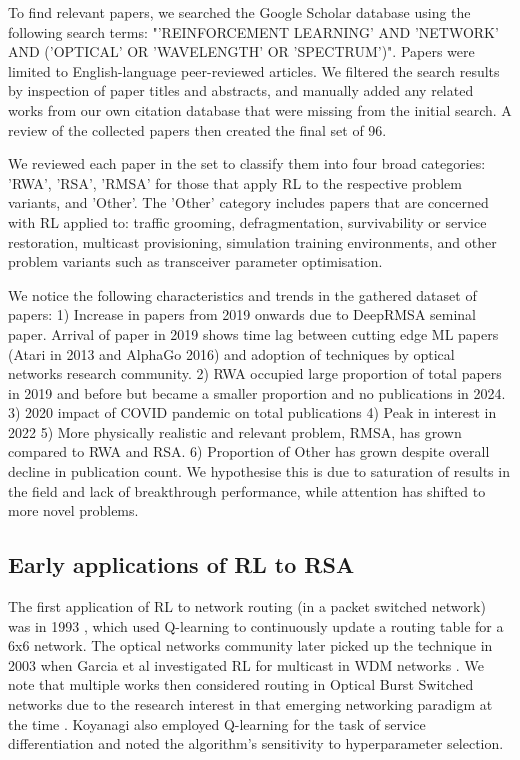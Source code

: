 To find relevant papers, we searched the Google Scholar database using the following search terms: "'REINFORCEMENT LEARNING' AND 'NETWORK' AND ('OPTICAL' OR 'WAVELENGTH' OR 'SPECTRUM')". Papers were limited to English-language peer-reviewed articles. We filtered the search results by inspection of paper titles and abstracts, and manually added any related works from our own citation database that were missing from the initial search. A review of the collected papers then created the final set of 96.

We reviewed each paper in the set to classify them into four broad categories: 'RWA', 'RSA', 'RMSA' for those that apply RL to the respective problem variants, and 'Other'.
The 'Other' category includes papers that are concerned with RL applied to: traffic grooming, defragmentation, survivability or service restoration, multicast provisioning, simulation training environments, and other problem variants such as transceiver parameter optimisation.

We notice the following characteristics and trends in the gathered dataset of papers: 
1) Increase in papers from 2019 onwards due to DeepRMSA seminal paper. Arrival of paper in 2019 shows time lag between cutting edge ML papers (Atari in 2013 and AlphaGo 2016) and adoption of techniques by optical networks research community.
2) RWA occupied large proportion of total papers in 2019 and before but became a smaller proportion and no publications in 2024.
3) 2020 impact of COVID pandemic on total publications
4) Peak in interest in 2022
5) More physically realistic and relevant problem, RMSA, has grown compared to RWA and RSA.
6) Proportion of Other has grown despite overall decline in publication count. We hypothesise this is due to saturation of results in the field and lack of breakthrough performance, while attention has shifted to more novel problems. 








\subsection{Early applications of RL to RSA}
\label{sec:survey-early_applications}

The first application of RL to network routing (in a packet switched network) was in 1993 \cite{boyan_packet_1993}, which used Q-learning to continuously update a routing table for a 6x6 network. The optical networks community later picked up the technique in 2003 when Garcia et al investigated RL for multicast in WDM networks \cite{garcia_multicast_2003}. We note that multiple works then considered routing in Optical Burst Switched networks due to the research interest in that emerging networking paradigm at the time \cite{kiran_reinforcement_2006,belbekkouche_reinforcement_2008}. Koyanagi also \cite{koyanagi_reinforcement_2009} employed Q-learning for the task of service differentiation and noted the algorithm's sensitivity to hyperparameter selection. 

